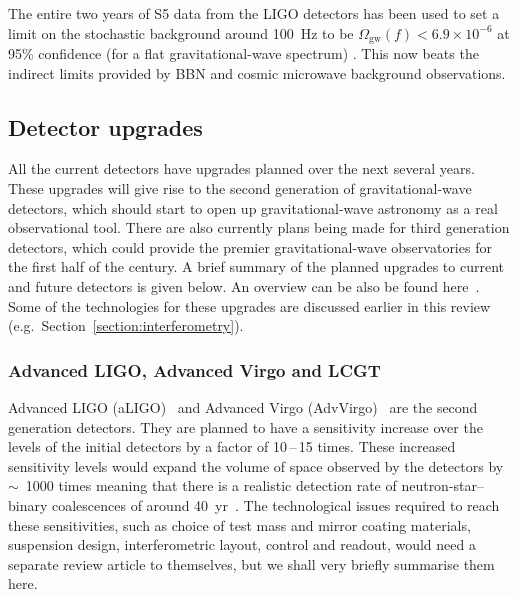 The entire two years of S5 data from the LIGO detectors has been used to set a
limit on the stochastic background around 100~Hz to be $\Omega_{\mathrm{gw}}(f) <
6.9\times10^{-6}$ at 95\% confidence (for a flat gravitational-wave spectrum)
\cite{Abbott:2009b}. This now beats the indirect limits provided by BBN and cosmic microwave background observations.


\subsection{Detector upgrades}


All the current detectors have upgrades planned over the next several years.
These upgrades will give rise to the second generation of gravitational-wave
detectors, which should start to open up gravitational-wave astronomy as a
real observational tool. There are also currently plans being made for third
generation detectors, which could provide the premier gravitational-wave
observatories for the first half of the century. A brief summary of the planned
upgrades to current and future detectors is given below. An overview can be also
be found here~\cite{Whitcomb:2008}. Some of the technologies for these upgrades
are discussed earlier in this review (e.g.\, Section~\ref{section:interferometry}).


\subsubsection{Advanced LIGO, Advanced Virgo and LCGT}
\label{subsection:aligo} 

Advanced LIGO (aLIGO)~\cite{Harry:2010, AdvLIGO, AdvLIGOweb} and Advanced Virgo
(AdvVirgo)~\cite{AdvVirgoDesign, AdvVirgoweb} are the second generation
detectors. They are planned to have a sensitivity increase over the levels of
the initial detectors by a factor of 10\,--\,15 times. These increased sensitivity
levels would expand the volume of space observed by the detectors by $\sim$~1000
times meaning that there is a realistic detection rate of neutron-star--binary
coalescences of around 40~yr~\cite{Abadie:2010e, Kopparapu:2008}.
The technological issues required to reach these sensitivities, such as choice
of test mass and mirror coating materials, suspension design, interferometric
layout, control and readout, would need a separate review article to themselves,
but we shall very briefly summarise them here.


